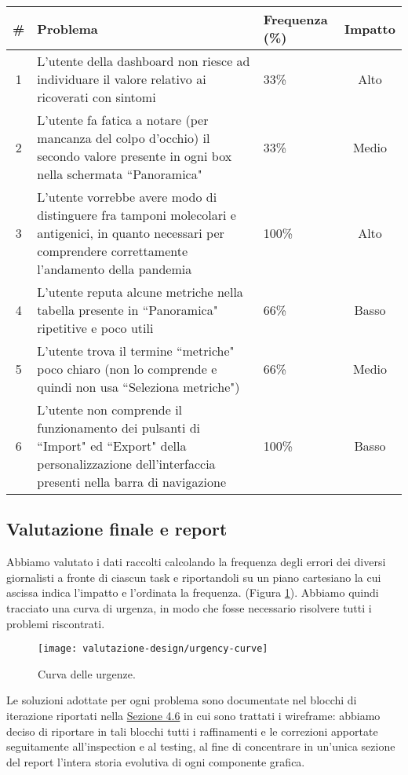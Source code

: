 {
\renewcommand{\arraystretch}{2}
\begin{longtable}{|c|p{9cm}|p{3cm}|c|}
    \hline
    \textbf{\#} & \textbf{Problema} & \textbf{Frequenza (\%)} & \textbf{Impatto} \\
    \hline
    \endhead
    1 & L'utente della dashboard non riesce ad individuare il valore relativo ai ricoverati con sintomi & 33\% & Alto \\
    \hline
    2 & L'utente fa fatica a notare (per mancanza del colpo d'occhio) il secondo valore presente in ogni box nella schermata ``Panoramica" & 33\% & Medio \\
    \hline
    3 & L'utente vorrebbe avere modo di distinguere fra tamponi molecolari e antigenici, in quanto necessari per comprendere correttamente l'andamento della pandemia & 100\% & Alto \\
    \hline
    4 & L'utente reputa alcune metriche nella tabella presente in ``Panoramica" ripetitive e poco utili & 66\% & Basso \\
    \hline
    5 & L'utente trova il termine ``metriche" poco chiaro (non lo comprende e quindi non usa ``Seleziona metriche") & 66\% & Medio \\
    \hline
    6 & L'utente non comprende il funzionamento dei pulsanti di ``Import" ed ``Export" della personalizzazione dell'interfaccia presenti nella barra di navigazione & 100\% & Basso \\
    \hline
\end{longtable}
}

\subsection{Valutazione finale e report}
\label{ss:valutazione-finale-report}
Abbiamo valutato i dati raccolti calcolando la frequenza degli errori dei diversi giornalisti a fronte di ciascun task e riportandoli su un piano cartesiano la cui ascissa indica l'impatto e l'ordinata la frequenza. (Figura \ref{fig:testing-urgency-curve}).
Abbiamo quindi tracciato una curva di urgenza, in modo che fosse necessario risolvere tutti i problemi riscontrati.

\begin{figure}[H]
    \centering
    \texttt{[image: valutazione-design/urgency-curve]}
    \caption{Curva delle urgenze.}
    \label{fig:testing-urgency-curve}
\end{figure}
\noindent
Le soluzioni adottate per ogni problema sono documentate nel blocchi di iterazione riportati nella \hyperref[s:wireframe]{Sezione 4.6} in cui sono trattati i wireframe: abbiamo deciso di riportare in tali blocchi tutti i raffinamenti e le correzioni apportate seguitamente all'inspection e al testing, al fine di concentrare in un'unica sezione del report l'intera storia evolutiva di ogni componente grafica.